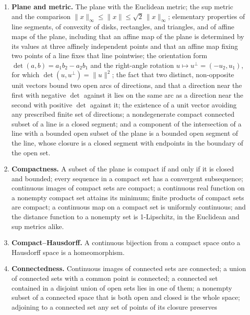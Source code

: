 \documentclass[11pt]{article}
\theoremstyle{mainplain}
\theoremstyle{mainroman}
\theoremstyle{definition}
\numberwithin{equation}{section}
\begin{document}
\begin{enumerate}
\item \textbf{Plane and metric.} The plane with the Euclidean metric;
      the sup metric and the comparison
      \(\|x\|_\infty\le\|x\|\le\sqrt2\,\|x\|_\infty\); elementary
      properties of line segments, of convexity of disks, rectangles,
      and triangles, and of affine maps of the plane, including that
      an affine map of the plane is determined by its values at three
      affinely independent points and that an affine map fixing two
      points of a line fixes that line pointwise; the orientation form
      \(\det(a,b)=a_1b_2-a_2b_1\) and the right-angle rotation
      \(u\mapsto u^{\perp}=(-u_2,u_1)\), for which
      \(\det(u,u^{\perp})=\|u\|^2\); the fact that two distinct,
      non-opposite unit vectors bound two open arcs of directions, and
      that a direction near the first with negative \(\det\) against it
      lies on the same arc as a direction near the second with positive
      \(\det\) against it; the existence of a unit vector avoiding any
      prescribed finite set of directions; a nondegenerate compact connected
      subset of a line is a closed segment; and a component of the
      intersection of a line with a bounded open subset of the plane
      is a bounded open segment of the line, whose closure is a closed
      segment with endpoints in the boundary of the open set.
\item \textbf{Compactness.} A subset of the plane is compact if and
      only if it is closed and bounded; every sequence in a compact
      set has a convergent subsequence; continuous images of compact
      sets are compact; a continuous real function on a nonempty
      compact set attains its minimum; finite products of compact sets
      are compact; a continuous map on a compact set is uniformly
      continuous; and the distance function to a nonempty set is
      1-Lipschitz, in the Euclidean and sup metrics alike.
\item \textbf{Compact--Hausdorff.} A continuous bijection from a
      compact space onto a Hausdorff space is a homeomorphism.
\item \textbf{Connectedness.} Continuous images of connected sets are
      connected; a union of connected sets with a common point is
      connected; a connected set contained in a disjoint union of open
      sets lies in one of them; a nonempty subset of a connected space
      that is both open and closed is the whole space; adjoining to a
      connected set any set of points of its closure preserves

\end{enumerate}
\end{document}
